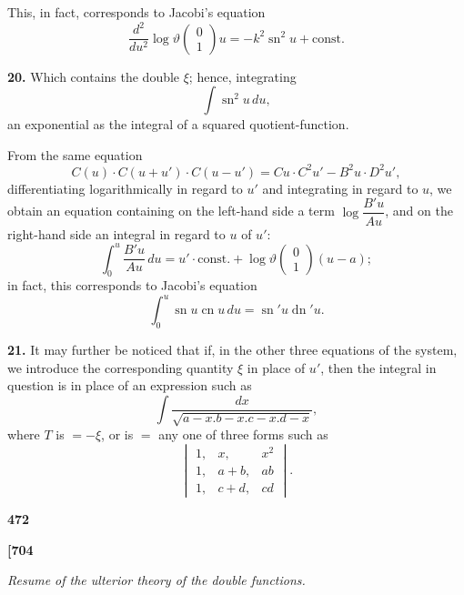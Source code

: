 \documentclass[12pt,a4paper]{article}
\DeclareMathOperator{\sn}{sn}
\DeclareMathOperator{\cn}{cn}
\DeclareMathOperator{\dn}{dn}
\theoremstyle{definition}
\begin{document}
This, in fact, corresponds to Jacobi's equation
\[
\frac{d^2}{du^2}\log \vartheta\begin{pmatrix} 0 \\ 1 \end{pmatrix}u = -k^2 \sn^2 u + \text{const.}
\]

\noindent\textbf{20.}\quad
Which contains the double $\xi$; hence, integrating
\[
\int \sn^2 u\, du,
\]
an exponential as the integral of a squared quotient-function.

From the same equation
\[
C(u) \cdot C(u + u') \cdot C(u - u') = Cu \cdot C^2 u' - B^2 u \cdot D^2 u',
\]
differentiating logarithmically in regard to $u'$ and integrating in regard to $u$, we obtain an equation containing on the left-hand side a term $\log \dfrac{B'u}{Au}$, and on the right-hand side an integral in regard to $u$ of $u'$:
\[
\int_0^u \frac{B'u}{Au}\, du = u' \cdot \text{const.} + \log \vartheta\begin{pmatrix} 0 \\ 1 \end{pmatrix}(u - a);
\]
in fact, this corresponds to Jacobi's equation
\[
\int_0^u \sn u \cn u \, du = \sn' u \dn' u.
\]

\noindent\textbf{21.}\quad
It may further be noticed that if, in the other three equations of the system, we introduce the corresponding quantity $\xi$ in place of $u'$, then the integral in question is in place of an expression such as
\[
\int \frac{dx}{\sqrt{a - x . b - x . c - x . d - x}},
\]
where $T$ is $= -\xi$, or is $= $ any one of three forms such as
\[
\begin{vmatrix}
1, & x, & x^2 \\
1, & a + b, & ab \\
1, & c + d, & cd
\end{vmatrix}.
\]

\vspace{1em}

\begin{center}
\textbf{472}
\end{center}

\vspace{0.5em}

\noindent\textbf{[704}

\vspace{0.5em}

\begin{center}
\textit{Resume of the ulterior theory of the double functions.}
\end{center}
\end{document}
